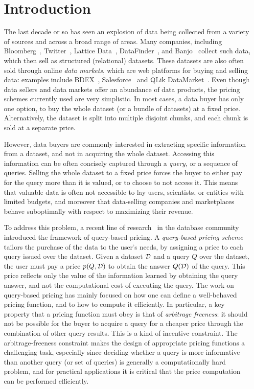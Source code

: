 \section{Introduction}
\label{sec:intro}

The last decade or so has seen an explosion of data being collected from a variety of sources and across a broad range of areas. Many companies, including Bloomberg~\cite{bloomberg}, Twitter~\cite{twitterapi}, Lattice Data~\cite{lattice}, DataFinder~\cite{datafinder}, and Banjo~\cite{banjo} collect such data, which then sell as structured (relational) datasets. 
These datasets are also often sold through online {\em data markets}, which are web platforms for buying and selling data: examples include BDEX~\cite{bdex}, Salesforce~\cite{salesforce} and QLik DataMarket~\cite{qlik}. Even though data sellers and data markets offer an abundance of data products, the pricing schemes currently used are very simplistic. In most cases, a data buyer has only one option, to buy the whole dataset (or a bundle of datasets) at a fixed price. Alternatively, the dataset is split into multiple disjoint chunks, and each chunk is sold at a separate price. 

However, data buyers are commonly interested in extracting specific information from a dataset, and not in acquiring the whole dataset. Accessing this information can be often concisely captured through a {\em query}, or a sequence of queries. Selling the whole dataset to a fixed price forces the buyer to either pay for the query more than it is valued, or to choose to not access it. This means that valuable data is often not accessible to lay users, scientists, or entities with limited budgets, and moreover that data-selling companies and marketplaces behave suboptimally with respect to maximizing their revenue.

To address this problem, a recent line of research~\cite{KUBHS12,KUBHS13,deep2017qirana} in the database community introduced the framework of  query-based pricing. A {\em query-based pricing scheme} tailors the purchase of the data to the user's needs, by assigning a price to each query issued over the dataset. Given a dataset $\mathcal{D}$ and a query $Q$ over the dataset, the user must pay a price $p(Q,\mathcal{D})$ to obtain the answer $Q(\mathcal{D})$ of the query. This price reflects only the value of the information learned by obtaining the query answer, and not the computational cost of executing the query. The work on query-based pricing has mainly focused on how one can define a well-behaved pricing function, and to how to compute it efficiently. In particular, a key property that a pricing function must obey is that of {\em arbitrage freeness}: it should not be possible for the buyer to acquire a query for a cheaper price through the combination of other query results. This is a kind of incentive constraint. The arbitrage-freeness constraint makes the design of appropriate pricing functions a challenging task, especially since deciding whether a query is more informative than another query (or set of queries) is generally a computationally hard problem, and for practical applications it is critical that the price computation can be performed efficiently.

